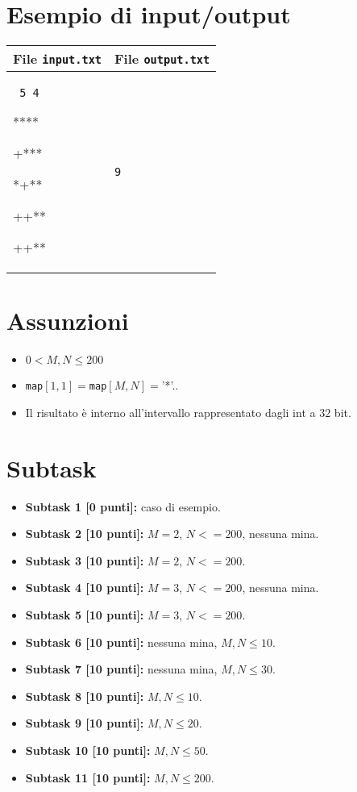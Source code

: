 \documentclass[a4paper,11pt]{article}
\newcommand{\file}[1]{\texttt{#1}}
\newcommand{\esempio}[2]{
\noindent\begin{minipage}{\textwidth}
\begin{tabular}{|p{11cm}|p{5cm}|}
	\hline
	\textbf{File \file{input.txt}} & \textbf{File \file{output.txt}}\\
	\hline
	\tt \small #1 &
	\tt \small #2 \\
	\hline
\end{tabular}
\end{minipage}
}
\begin{document}
\section*{Esempio di input/output}
\esempio{
5 4

****

+***

*+**

++**

++**
}{9}


\section*{Assunzioni}
\begin{itemize}
\item $0 < M,N \le 200$
\item \file{map}$[1,1]=$\file{map}$[M,N]=$'*'..
\item Il risultato è interno all'intervallo rappresentato dagli int a $32$ bit.

\end{itemize}

\section*{Subtask}
\begin{itemize}
\item \textbf{Subtask 1 [\phantom{1}0 punti]:} caso di esempio.
\item \textbf{Subtask 2 [10 punti]:} $M = 2$, $N <= 200$, nessuna mina.
\item \textbf{Subtask 3 [10 punti]:} $M = 2$, $N <= 200$.
\item \textbf{Subtask 4 [10 punti]:} $M = 3$, $N <= 200$, nessuna mina.
\item \textbf{Subtask 5 [10 punti]:} $M = 3$, $N <= 200$.
\item \textbf{Subtask 6 [10 punti]:} nessuna mina, $M,N \le 10$.
\item \textbf{Subtask 7 [10 punti]:} nessuna mina, $M,N \le 30$.
\item \textbf{Subtask 8 [10 punti]:} $M,N \le 10$.
\item \textbf{Subtask 9 [10 punti]:} $M,N \le 20$.
\item \textbf{Subtask 10 [10 punti]:} $M,N \le 50$.
\item \textbf{Subtask 11 [10 punti]:} $M,N \le 200$.  
\end{itemize}
\end{document}

